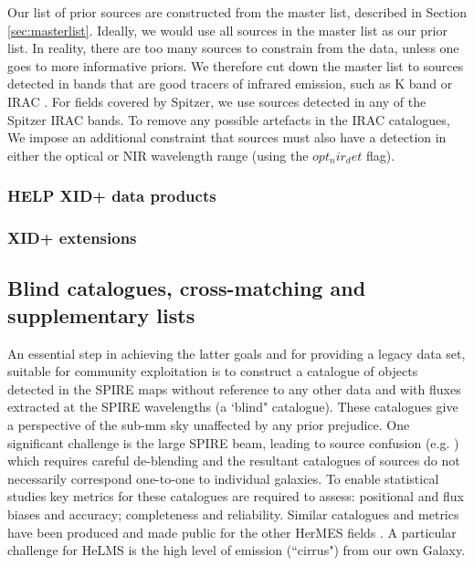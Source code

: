 \documentclass[usenatbib]{mnras}
\begin{document}
Our list of prior sources are constructed from the master list, described in Section \ref{sec:masterlist}. Ideally, we would use all sources in the master list as our prior list. In reality, there are too many sources to constrain from the data, unless one goes to more informative priors. We therefore cut down the master list to sources detected in bands that are good tracers of infrared emission, such as K band or IRAC \citep{Duivenvorden:2018}. For fields covered by Spitzer, we use sources detected in any of the Spitzer IRAC bands. To remove any possible artefacts in the IRAC catalogues, We impose an additional constraint that sources must also have a detection in either the optical or NIR wavelength range (using the $opt_nir_det$ flag). 


\subsubsection{HELP XID+ data products}
\subsubsection{XID+ extensions}


\subsection{Blind catalogues, cross-matching and supplementary lists}

An essential step in achieving the latter goals and for providing a legacy data
set, suitable for community exploitation is to construct a catalogue of objects
detected in the SPIRE maps without reference to any other data and with fluxes
extracted at the SPIRE wavelengths (a `blind" catalogue).  These catalogues give
a perspective of the sub-mm sky unaffected by any prior prejudice. One
significant challenge is the large SPIRE beam, leading to source confusion (e.g.
\citealt{Nguyen:2010lr}) which requires careful de-blending and the resultant
catalogues of sources do not necessarily correspond one-to-one to individual
galaxies.   To enable statistical studies key metrics for these catalogues are
required to assess: positional and flux biases and accuracy; completeness and
reliability.   Similar catalogues and metrics have been produced and made public
for the other HerMES fields \citep{Smith:2012lr,Wang:2013lr}. A particular
challenge for HeLMS is the high level of emission (``cirrus") from our own
Galaxy.
\end{document}

